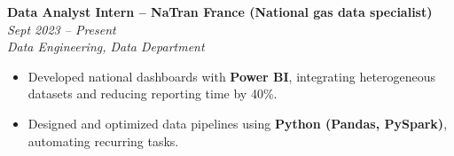 \textbf{Data Analyst Intern – NaTran France (National gas data specialist)} \hfill \textit{Sept 2023 – Present}\\
\textit{Data Engineering, Data Department}
\begin{itemize}
    \item Developed national dashboards with \textbf{Power BI}, integrating heterogeneous datasets and reducing reporting time by 40\%.
    \item Designed and optimized data pipelines using \textbf{Python (Pandas, PySpark)}, automating recurring tasks.
\end{itemize}
